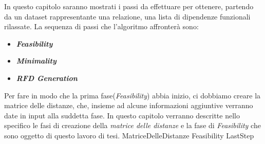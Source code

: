 In questo capitolo saranno mostrati i passi da effettuare per ottenere, partendo da un dataset rappresentante una relazione, una lista di dipendenze funzionali rilassate.
La sequenza di passi che l'algoritmo affronterà sono:
\begin{itemize}
	\item \textbf{\emph{Feasibility}}
	\item \textbf{\emph{Minimality}}
	\item \textbf{\emph{RFD Generation}}
\end{itemize}
Per fare in modo che la prima fase(\emph{Feasibility}) abbia inizio, ci dobbiamo creare la matrice delle distanze, che, insieme ad alcune informazioni aggiuntive verranno date in input alla suddetta fase.
In questo capitolo verranno descritte nello specifico le fasi di creazione della \emph{matrice delle distanze} e la fase di \emph{Feasibility} che sono oggetto di questo lavoro di tesi.
{MatriceDelleDistanze}
{Feasibility}
{LastStep}